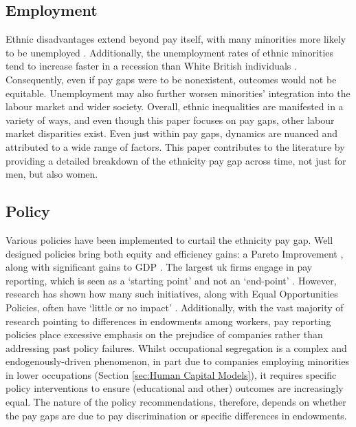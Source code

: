\documentclass[class=article, crop=false]{standalone}
\begin{document}
\subsection{Employment}
\label{sec:Employment}
Ethnic disadvantages extend beyond pay itself, with many minorities more likely to be unemployed \citep{Heath}. Additionally, the unemployment rates of ethnic minorities tend to increase faster in a recession than White British individuals \citep{Jones}. Consequently, even if pay gaps were to be nonexistent, outcomes would not be equitable. Unemployment may also further worsen minorities' integration into the labour market and wider society. Overall, ethnic inequalities are manifested in a variety of ways, and even though this paper focuses on pay gaps, other labour market disparities exist. Even just within pay gaps, dynamics are nuanced and attributed to a wide range of factors. This paper contributes to the literature by providing a detailed breakdown of the ethnicity pay gap across time, not just for men, but also women.

\subsection{Policy}
\label{sec:Policy} %
Various policies have been implemented to curtail the ethnicity pay gap. Well designed policies bring both equity and efficiency gains: a Pareto Improvement \citep{LundbergB}, along with significant gains to GDP \citep{GOVg}. The largest \acrshort{uk} firms engage in pay reporting, which is seen as a \enquote*{starting point} and not an \enquote*{end-point} \citep{BoE}. However, research has shown how many such initiatives, along with Equal Opportunities Policies, often have \enquote*{little or no impact} \cite[p.~113]{Noon}. Additionally, with the vast majority of research pointing to differences in endowments among workers, pay reporting policies place excessive emphasis on the prejudice of companies rather than addressing past policy failures. Whilst occupational segregation is a complex and endogenously-driven phenomenon, in part due to companies employing minorities in lower occupations (Section \ref{sec:Human Capital Models}), it requires specific policy interventions to ensure (educational and other) outcomes are increasingly equal. The nature of the policy recommendations, therefore, depends on whether the pay gaps are due to pay discrimination or specific differences in endowments.

\ifstandalone

\fi
\end{document}
